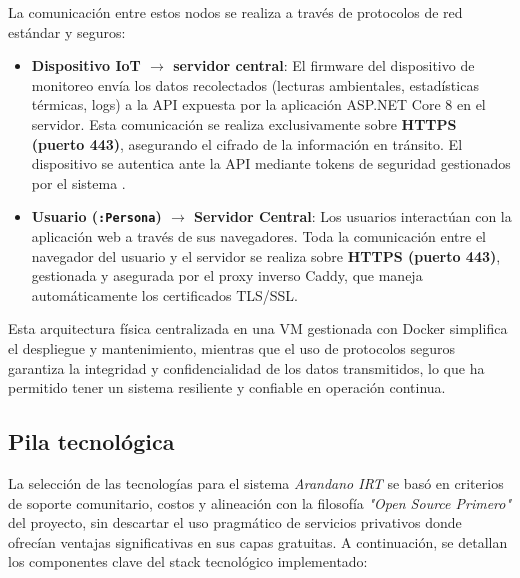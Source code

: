 La comunicación entre estos nodos se realiza a través de protocolos de red estándar y seguros:

\begin{itemize}
    \item \textbf{Dispositivo IoT $\rightarrow$ servidor central}: El firmware del dispositivo de monitoreo envía los datos recolectados (lecturas ambientales, estadísticas térmicas, logs) a la API expuesta por la aplicación ASP.NET Core 8 en el servidor. Esta comunicación se realiza exclusivamente sobre \textbf{HTTPS (puerto 443)}, asegurando el cifrado de la información en tránsito. El dispositivo se autentica ante la API mediante tokens de seguridad gestionados por el sistema .
    \item \textbf{Usuario (\texttt{:Persona}) $\rightarrow$ Servidor Central}: Los usuarios interactúan con la aplicación web a través de sus navegadores. Toda la comunicación entre el navegador del usuario y el servidor se realiza sobre \textbf{HTTPS (puerto 443)}, gestionada y asegurada por el proxy inverso Caddy, que maneja automáticamente los certificados TLS/SSL.
\end{itemize}

Esta arquitectura física centralizada en una VM gestionada con Docker simplifica el despliegue y mantenimiento, mientras que el uso de protocolos seguros garantiza la integridad y confidencialidad de los datos transmitidos, lo que ha permitido tener un sistema resiliente y confiable en operación continua.

\subsection{Pila tecnológica}

La selección de las tecnologías para el sistema \textit{Arandano IRT} se basó en criterios de soporte comunitario, costos y alineación con la filosofía \textit{"Open Source Primero"} del proyecto, sin descartar el uso pragmático de servicios privativos donde ofrecían ventajas significativas en sus capas gratuitas. A continuación, se detallan los componentes clave del stack tecnológico implementado:

